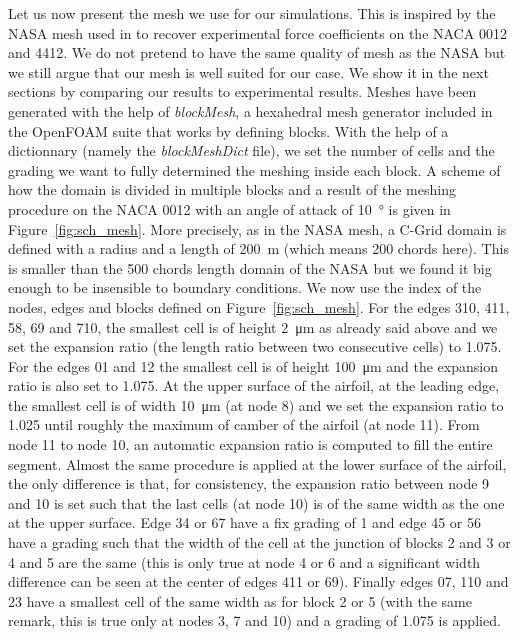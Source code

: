 \begin{subappendices}
	Let us now present the mesh we use for our simulations. This is inspired by the \acrfull{NASA} mesh used in \cite{TMR} to recover experimental force coefficients on the \acrshort{NACA} 0012 and 4412. We do not pretend to have the same quality of mesh as the \acrshort{NASA} but we still argue that our mesh is well suited for our case. We show it in the next sections by comparing our results to experimental results. Meshes have been generated with the help of \emph{blockMesh}, a hexahedral mesh generator included in the OpenFOAM suite that works by defining blocks. With the help of a dictionnary (namely the \emph{blockMeshDict} file), we set the number of cells and the grading we want to fully determined the meshing inside each block. A scheme of how the domain is divided in multiple blocks and a result of the meshing procedure on the \acrshort{NACA} 0012 with an angle of attack of \SI{10}{\degree} is given in Figure~\ref{fig:sch_mesh}. More precisely, as in the \acrshort{NASA} mesh, a C-Grid domain is defined with a radius and a length of \SI{200}{\meter} (which means 200 chords here). This is smaller than the 500 chords length domain of the \acrshort{NASA} but we found it big enough to be insensible to boundary conditions. We now use the index of the nodes, edges and blocks defined on Figure~\ref{fig:sch_mesh}. For the edges 310, 411, 58, 69 and 710, the smallest cell is of height \SI{2}{\micro\meter} as already said above and we set the expansion ratio (the length ratio between two consecutive cells) to 1.075. For the edges 01 and 12 the smallest cell is of height \SI{100}{\micro\meter} and the expansion ratio is also set to 1.075. At the upper surface of the airfoil, at the leading edge, the smallest cell is of width \SI{10}{\micro\meter} (at node 8) and we set the expansion ratio to 1.025 until roughly the maximum of camber of the airfoil (at node 11). From node 11 to node 10, an automatic expansion ratio is computed to fill the entire segment. Almost the same procedure is applied at the lower surface of the airfoil, the only difference is that, for consistency, the expansion ratio between node 9 and 10 is set such that the last cells (at node 10) is of the same width as the one at the upper surface. Edge 34 or 67 have a fix grading of 1 and edge 45 or 56 have a grading such that the width of the cell at the junction of blocks 2 and 3 or 4 and 5 are the same (this is only true at node 4 or 6 and a significant width difference can be seen at the center of edges 411 or 69). Finally edges 07, 110 and 23 have a smallest cell of the same width as for block 2 or 5 (with the same remark, this is true only at nodes 3, 7 and 10) and a grading of 1.075 is applied.
	

\end{subappendices}
